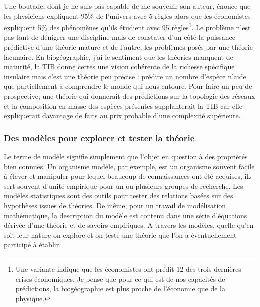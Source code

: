 Une boutade, dont je ne suis pas capable de me souvenir son auteur,
énonce que les physiciens expliquent 95\% de l'univers avec 5 règles
alors que les économistes expliquent 5\% des phénomènes qu'ils étudient
avec 95 règles\footnote{Une variante indique que les économistes ont
  prédit 12 des trois dernières crises économiques. Je pense que pour ce
  qui est de nos capacités de prédictions, la biogéographie est plus
  proche de l'économie que de la physique.}. Le problème n'est pas tant
de dénigrer une discipline mais de constater d'un côté la puissance
prédictive d'une théorie mature et de l'autre, les problèmes posés par
une théorie lacunaire. En biogéographie, j'ai le sentiment que les
théories manquent de maturité, la TIB donne certes une vision cohérente
de la richesse spécifique insulaire mais c'est une théorie peu précise :
prédire un nombre d'espèce n'aide que partiellement à comprendre le
monde qui nous entoure. Pour faire un peu de prospective, une théorie
qui donnerait des prédictions sur la topologie des réseaux et la
composition en masse des espèces présentes supplanterait la TIB car elle
expliquerait davantage de faits au prix probable d'une complexité
supérieure.

\subsubsection*{Des modèles pour explorer et tester la
théorie}\label{des-moduxe8les-pour-explorer-et-tester-la-thuxe9orie}

Le terme de modèle signifie simplement que l'objet en question à des
propriétés bien connues. Un organisme modèle, par exemple, est un
organisme souvent facile à élever et manipuler pour lequel beaucoup de
connaissances ont été acquises, iL sert souvent d'unité empirique pour
un ou plusieurs groupes de recherche. Les modèles statistiques sont des
outils pour tester des relations basées sur des hypothèses issues de
théories. De même, pour un travail de modélisation mathématique, la
description du modèle est contenu dans une série d'équations dérivée
d'une théorie et de savoirs empiriques. A travers les modèles, quelle
qu'en soit leur nature on explore et on teste une théorie que l'on a
éventuellement participé à établir.

